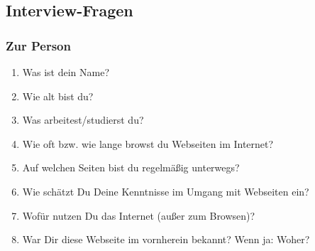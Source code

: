 \subsection*{Interview-Fragen}
\subsubsection*{Zur Person}
\begin{enumerate}
\item Was ist dein Name?
\item Wie alt bist du?
\item Was arbeitest/studierst du?
\item Wie oft bzw. wie lange browst du Webseiten im Internet?
\item Auf welchen Seiten bist du regelmäßig unterwegs?
\item Wie schätzt Du Deine Kenntnisse im Umgang mit Webseiten ein?
\item Wofür nutzen Du das Internet (außer zum Browsen)?
\item War Dir diese Webseite im vornherein bekannt? Wenn ja: Woher?
\end{enumerate}


